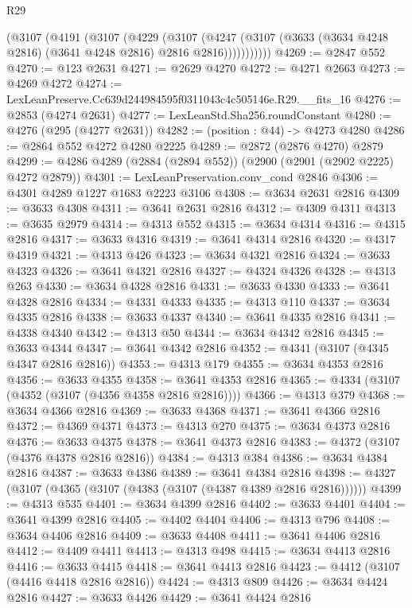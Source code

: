 \begin{lexlean}{R29}
\begin{coremodule}
          (@3107
            (@4191
              (@3107
                (@4229
                  (@3107
                    (@4247
                      (@3107 (@3633 (@3634 @4248 @2816) (@3641 @4248 @2816) @2816 @2816)))))))))))
@4269 := @2847 @552
@4270 := @123 @2631
@4271 := @2629 @4270
@4272 := @4271 @2663
@4273 := @4269 @4272
@4274 := LexLeanPreserve.Cc639d244984595f0311043c4c505146e.R29.__fits_16
@4276 := @2853 (@4274 @2631)
@4277 := LexLeanStd.Sha256.roundConstant
@4280 := @4276 (@295 (@4277 @2631))
@4282 := (position : @44) -> @4273 @4280
@4286 := @2864 @552 @4272 @4280 @2225
@4289 := @2872 (@2876 @4270) @2879
@4299 := @4286 @4289 (@2884 (@2894 @552)) (@2900 (@2901 (@2902 @2225) @4272 @2879))
@4301 := LexLeanPreservation.conv_cond @2846
@4306 := @4301 @4289 @1227 @1683 @2223 @3106
@4308 := @3634 @2631 @2816
@4309 := @3633 @4308
@4311 := @3641 @2631 @2816
@4312 := @4309 @4311
@4313 := @3635 @2979
@4314 := @4313 @552
@4315 := @3634 @4314
@4316 := @4315 @2816
@4317 := @3633 @4316
@4319 := @3641 @4314 @2816
@4320 := @4317 @4319
@4321 := @4313 @426
@4323 := @3634 @4321 @2816
@4324 := @3633 @4323
@4326 := @3641 @4321 @2816
@4327 := @4324 @4326
@4328 := @4313 @263
@4330 := @3634 @4328 @2816
@4331 := @3633 @4330
@4333 := @3641 @4328 @2816
@4334 := @4331 @4333
@4335 := @4313 @110
@4337 := @3634 @4335 @2816
@4338 := @3633 @4337
@4340 := @3641 @4335 @2816
@4341 := @4338 @4340
@4342 := @4313 @50
@4344 := @3634 @4342 @2816
@4345 := @3633 @4344
@4347 := @3641 @4342 @2816
@4352 := @4341 (@3107 (@4345 @4347 @2816 @2816))
@4353 := @4313 @179
@4355 := @3634 @4353 @2816
@4356 := @3633 @4355
@4358 := @3641 @4353 @2816
@4365 := @4334 (@3107 (@4352 (@3107 (@4356 @4358 @2816 @2816))))
@4366 := @4313 @379
@4368 := @3634 @4366 @2816
@4369 := @3633 @4368
@4371 := @3641 @4366 @2816
@4372 := @4369 @4371
@4373 := @4313 @270
@4375 := @3634 @4373 @2816
@4376 := @3633 @4375
@4378 := @3641 @4373 @2816
@4383 := @4372 (@3107 (@4376 @4378 @2816 @2816))
@4384 := @4313 @384
@4386 := @3634 @4384 @2816
@4387 := @3633 @4386
@4389 := @3641 @4384 @2816
@4398 := @4327 (@3107 (@4365 (@3107 (@4383 (@3107 (@4387 @4389 @2816 @2816))))))
@4399 := @4313 @535
@4401 := @3634 @4399 @2816
@4402 := @3633 @4401
@4404 := @3641 @4399 @2816
@4405 := @4402 @4404
@4406 := @4313 @796
@4408 := @3634 @4406 @2816
@4409 := @3633 @4408
@4411 := @3641 @4406 @2816
@4412 := @4409 @4411
@4413 := @4313 @498
@4415 := @3634 @4413 @2816
@4416 := @3633 @4415
@4418 := @3641 @4413 @2816
@4423 := @4412 (@3107 (@4416 @4418 @2816 @2816))
@4424 := @4313 @809
@4426 := @3634 @4424 @2816
@4427 := @3633 @4426
@4429 := @3641 @4424 @2816

\end{coremodule}
\end{lexlean}
